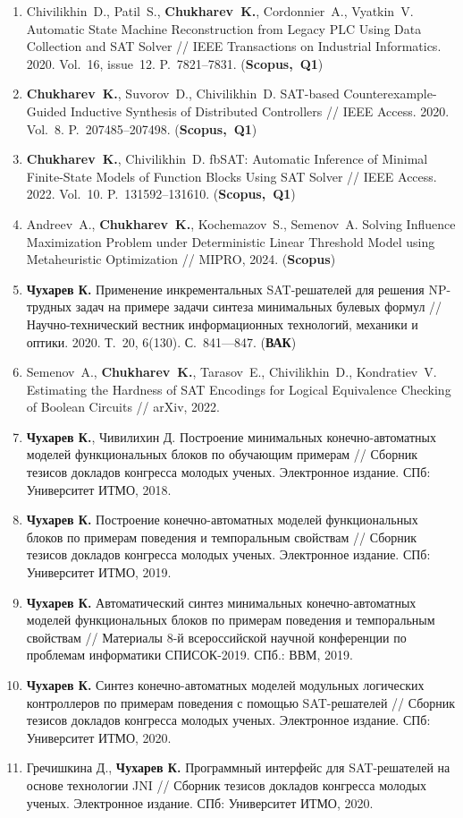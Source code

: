 \begin{enumerate}[left=0pt, beginpenalty=10000]
    \item Chivilikhin~D., Patil~S., \textbf{Chukharev~K.}, Cordonnier~A., Vyatkin~V. Automatic State Machine Reconstruction from Legacy PLC Using Data Collection and SAT Solver // IEEE Transactions on Industrial Informatics. 2020. Vol.~16, issue~12. P.~7821–7831. (\textbf{Scopus,~Q1})
    \item \textbf{Chukharev~K.}, Suvorov~D., Chivilikhin~D. SAT-based Counterexample-Guided Inductive Synthesis of Distributed Controllers // IEEE Access. 2020. Vol.~8. P.~207485–207498. (\textbf{Scopus,~Q1})
    \item \textbf{Chukharev~K.}, Chivilikhin~D. fbSAT: Automatic Inference of Minimal Finite-State Models of Function Blocks Using SAT Solver // IEEE Access. 2022. Vol.~10. P.~131592–131610. (\textbf{Scopus,~Q1})
    \item Andreev~A., \textbf{Chukharev~K.}, Kochemazov~S., Semenov~A. Solving Influence Maximization Problem under Deterministic Linear Threshold Model using Metaheuristic Optimization // MIPRO, 2024. (\textbf{Scopus})
    \item \textbf{Чухарев К.} Применение инкрементальных SAT-решателей для решения NP-трудных задач на примере задачи синтеза минимальных булевых формул // Научно-технический вестник информационных технологий, механики и оптики. 2020. Т.~20, 6(130). С.~841—847. (\textbf{ВАК})
    \item Semenov~A., \textbf{Chukharev~K.}, Tarasov~E., Chivilikhin~D., Kondratiev~V. Estimating the Hardness of SAT Encodings for Logical Equivalence Checking of Boolean Circuits // arXiv, 2022.
    \item \textbf{Чухарев К.}, Чивилихин Д. Построение минимальных конечно-автоматных моделей функциональных блоков по обучающим примерам // Сборник тезисов докладов конгресса молодых ученых. Электронное издание. СПб: Университет ИТМО, 2018.
    \item \textbf{Чухарев К.} Построение конечно-автоматных моделей функциональных блоков по примерам поведения и темпоральным свойствам // Сборник тезисов докладов конгресса молодых ученых. Электронное издание. СПб: Университет ИТМО, 2019.
    \item \textbf{Чухарев К.} Автоматический синтез минимальных конечно-автоматных моделей функциональных блоков по примерам поведения и темпоральным свойствам // Материалы 8-й всероссийской научной конференции по проблемам информатики СПИСОК-2019. СПб.: ВВМ, 2019.
    \item \textbf{Чухарев К.} Синтез конечно-автоматных моделей модульных логических контроллеров по примерам поведения с помощью SAT-решателей // Сборник тезисов докладов конгресса молодых ученых. Электронное издание. СПб: Университет ИТМО, 2020.
    \item Гречишкина Д., \textbf{Чухарев К.} Программный интерфейс для SAT-решателей на основе технологии JNI // Сборник тезисов докладов конгресса молодых ученых. Электронное издание. СПб: Университет ИТМО, 2020.
\end{enumerate}


